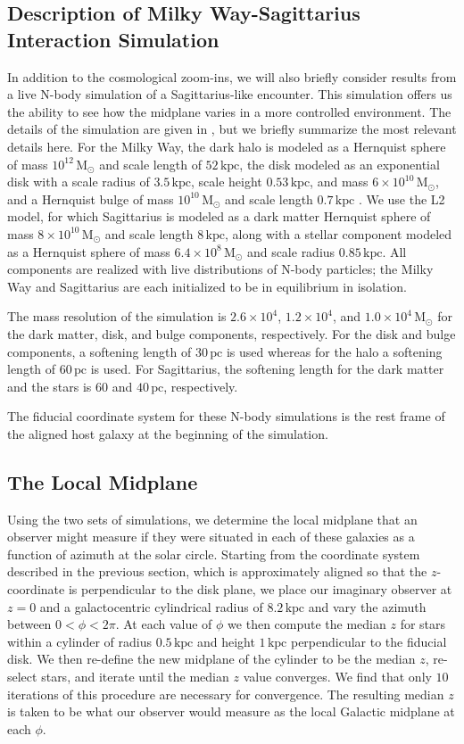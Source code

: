 \documentclass[twocolumn]{aastex62}
\newcommand{\Msun}{\ensuremath{\text{M}_\odot}}
\newcommand{\pc}{\text{pc}}
\newcommand{\kpc}{\text{kpc}}
\begin{document}
\subsection{Description of Milky Way-Sagittarius Interaction Simulation} 
\label{ssec:sag_sim}
In addition to the cosmological zoom-ins, we will also briefly consider
results from a live N-body simulation of a Sagittarius-like encounter. This
simulation offers us the ability to see how the midplane varies in a more
controlled environment. The details of the simulation are given in
\citet{2018MNRAS.481..286L}, but we briefly summarize the most relevant
details here. For the Milky Way, the dark halo is modeled as a Hernquist
sphere of mass $10^{12}\,\Msun$ and scale length of $52\,\kpc$, the disk
modeled as an exponential disk with a scale radius of $3.5\,\kpc$, scale
height $0.53\,\kpc$, and mass $6\times10^{10}\,\Msun$, and a Hernquist bulge
of mass $10^{10}\,\Msun$ and scale length $0.7\,\kpc$
\citep{1990ApJ...356..359H}. We use the L2 model, for which Sagittarius is
modeled as a dark matter Hernquist sphere of mass $8\times10^{10}\,\Msun$ and
scale length $8\,\kpc$, along with a stellar component modeled as a Hernquist
sphere of mass $6.4\times10^8\,\Msun$ and scale radius $0.85\,\kpc$. All
components are realized with live distributions of N-body particles; the Milky
Way and Sagittarius are each initialized to be in equilibrium in isolation.

The mass resolution of the simulation is $2.6\times10^4$, $1.2\times10^4$, and
$1.0\times10^4\,\Msun$ for the dark matter, disk, and bulge components,
respectively. For the disk and bulge components, a softening length of
$30\,\pc$ is used whereas for the halo a softening length of $60\,\pc$ is
used. For Sagittarius, the softening length for the dark matter and the stars
is $60$ and $40\,\pc$, respectively.

The fiducial coordinate system for these N-body simulations is the rest frame
of the aligned host galaxy at the beginning of the simulation.

\subsection{The Local Midplane} \label{ssec:local_midplane}
Using the two sets of simulations, we determine the local midplane that an
observer might measure if they were situated in each of these galaxies as a
function of azimuth at the solar circle. Starting from the coordinate system
described in the previous section, which is approximately aligned so that the
$z$-coordinate is perpendicular to the disk plane, we place our imaginary
observer at $z=0$ and a galactocentric cylindrical radius of $8.2\,\kpc$ and
vary the azimuth between $0<\phi<2\pi$. At each value of $\phi$ we then
compute the median $z$ for stars within a cylinder of radius $0.5\,\kpc$ and
height $1\,\kpc$ perpendicular to the fiducial disk. We then re-define the new
midplane of the cylinder to be the median $z$, re-select stars, and iterate
until the median $z$ value converges. We find that only $10$ iterations of
this procedure are necessary for convergence. The resulting median $z$ is
taken to be what our observer would measure as the local Galactic midplane at
each $\phi$.
\end{document}
